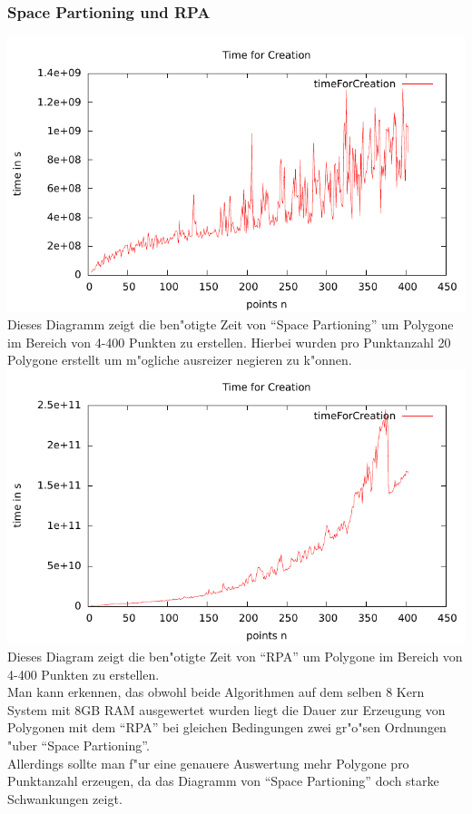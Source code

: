     \subsubsection{Space Partioning und RPA}
      \includegraphics{img/sp_diagram_0.pdf}\\
      Dieses Diagramm zeigt die ben"otigte Zeit von \enquote{Space Partioning} um 
      Polygone im Bereich von 4-400 Punkten zu erstellen. Hierbei wurden pro 
      Punktanzahl 20 Polygone erstellt um m"ogliche ausreizer negieren zu k"onnen.\\
      \includegraphics{img/rpa_diagram_0.pdf}\\
      Dieses Diagram zeigt die ben"otigte Zeit von \enquote{RPA} um Polygone
      im Bereich von 4-400 Punkten zu erstellen.\\
      Man kann erkennen, das obwohl beide Algorithmen auf dem selben 8 Kern
      System mit 8GB RAM ausgewertet wurden liegt die Dauer zur Erzeugung von 
      Polygonen mit dem \enquote{RPA} bei gleichen Bedingungen zwei gr"o"sen 
      Ordnungen "uber \enquote{Space Partioning}.\\
      Allerdings sollte man f"ur eine genauere Auswertung mehr Polygone pro
      Punktanzahl erzeugen, da das Diagramm von \enquote{Space Partioning} doch
      starke Schwankungen zeigt.
